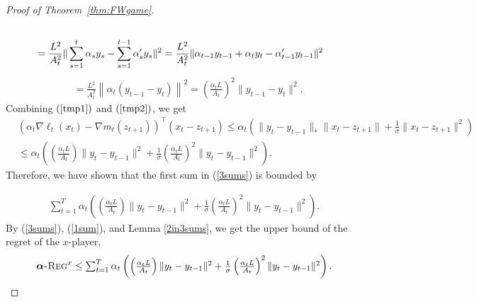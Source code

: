 \documentclass[pmlr]{jmlr} %
\def\balpha{\boldsymbol{\alpha}}
\newcommand{\regret}[1]{\balpha\textsc{-Reg}^{#1}}
\newcommand{\pr}[1]{\left(#1\right)}
\begin{document}
\begin{proof}[Proof of Theorem~\ref{thm:FWgame}]
\begin{equation*}
\begin{aligned}
	\\\textstyle &= \frac{L^{2}}{A_{t}^{2}} \|  \sum_{s=1}^{t} \alpha_{s} y_{s} - \sum_{{s=1}}^{t-1} \alpha_{s}' y_{s}  \|^{2} = \frac{L^{2}}{A_{t}^{2}} \| \alpha_{t-1} y_{t-1} + \alpha_{t} y_{t} - \alpha'_{t-1} y_{t-1} \|^{2}
	\end{aligned}
	\end{equation*}\vspace{-8mm}
	\begin{align}
	&= \textstyle \frac{L^{2}}{A_{t}^{2}} \left\|  \alpha_{t} ( y_{t-1} - y_{t} ) \right\|^{2}
	= \pr{\frac{\alpha_{t} L }{A_{t}}}^{2} \|y_{t-1} - y_{t} \|^{2}. \label{tmp2}
	\end{align}	
	Combining $(\ref{tmp1})$ and $(\ref{tmp2})$, we get
	\begin{equation}
	\begin{aligned}
	& ( \alpha_{t} \nabla \ell_{t}(x_{t}) - \nabla m_{t}(z_{t+1})  )^{\top} (x_{t} - z_{t+1})
	\leq \alpha_{t}  ( \| y_{t} - y_{t-1} \|_{*} \| x_{t}- z_{t+1} \| + \frac{1}{\sigma} \| x_{t} - z_{t+1} \|^{2} ) 
	\\ & \textstyle\leq \alpha_{t}  \pr{\pr{\frac{\alpha_{t} L }{A_{t}}}  \| y_{t} - y_{t-1} \|^{2} + \frac{1}{\sigma} \pr{\frac{\alpha_{t} L}{A_{t}}}^{2}  \| y_{t} - y_{t-1} \|^{2} }.
	\end{aligned}
	\end{equation}
	Therefore, we have shown that the first sum in (\ref{3sums}) is bounded by

\begin{comment}
\begin{equation} \label{1sum}
\begin{aligned}
&\textstyle
\sum_{t=1}^{T}( \alpha_{t} \nabla \ell_{t}(x_{t}) - \nabla m_{t}(z_{t+1})  )^{\top} (x_{t} - z_{t+1})
\leq 	\sum_{t=1}^{T}
\alpha_{t} \big( \frac{\alpha_{t} L}{A_{t}} \| y_{t} - y_{t-1} \|^{2} 
 + \frac{1}{\sigma} (\frac{\alpha_{t} L }{A_{t}})^{2} \big) \| y_{t} - y_{t-1} \|^{2}.
\end{aligned}
\end{equation}
\end{comment}

	\begin{equation} \label{1sum}
	\begin{aligned}
	\textstyle
	\sum_{t=1}^{T}
	\alpha_{t}  \pr{ \pr{\frac{\alpha_{t} L}{A_{t}}}  \| y_{t} - y_{t-1} \|^{2} 	+  \frac{1}{\sigma} \pr{\frac{\alpha_{t} L }{A_{t}}}^{2}  \| y_{t} - y_{t-1} \|^{2} }.
	\end{aligned}
	\end{equation}
	By (\ref{3sums}), (\ref{1sum}), and Lemma \ref{2in3sums}, we get the upper bound of the regret of the $x$-player,
	\begin{equation} \label{regret_{x}}
\textstyle	\regret{x} \leq \sum_{t=1}^{T}
	\alpha_{t}  \pr{\pr{\frac{\alpha_{t} L}{A_{t}}}  \| y_{t} - y_{t-1} \|^{2} + \frac{1}{\sigma} \pr{\frac{\alpha_{t} L }{A_{t}}}^{2}  \| y_{t} - y_{t-1} \|^{2} }.
	\end{equation}
	

\end{proof}
\end{document}
